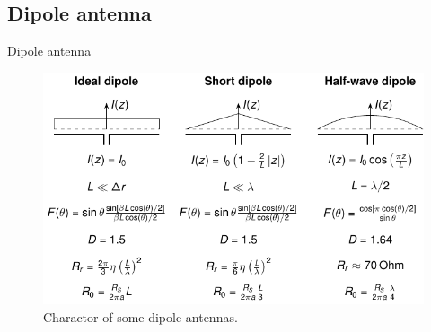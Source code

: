 \subsection{Dipole antenna}

\begin{frame}{Dipole antenna}
    \begin{figure}
        \centering
        \includegraphics[width=\textwidth]{Figures/Dipole.pdf}
        \caption{Charactor of some dipole antennas.}
        \label{fig:Dipole_antennas}
    \end{figure}
\end{frame}
